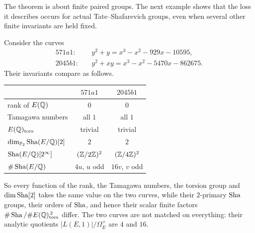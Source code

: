 The theorem is about finite paired groups.  The next example shows that
the loss it describes occurs for actual Tate--Shafarevich groups, even
when several other finite invariants are held fixed.

\begin{example}\label{ex:apparatus:sha-pair}
Consider the curves
\[
\begin{aligned}
  571a1:&\quad y^2+y=x^3-x^2-929x-10595,\\
  2045b1:&\quad y^2+xy=x^3-x^2-5470x-862675.
\end{aligned}
\]
Their invariants compare as follows.
\begin{center}
\small
\begin{tabular}{@{}lcc@{}}
\toprule
 & $571a1$ & $2045b1$ \\
\midrule
rank of $E(\mathbb{Q})$ & $0$ & $0$ \\
Tamagawa numbers & all $1$ & all $1$ \\
$E(\mathbb{Q})_{\operatorname{tors}}$ & trivial & trivial \\
$\dim_{\mathbb F_2}\operatorname{Sha}(E/\mathbb{Q})[2]$ & $2$ & $2$ \\
$\operatorname{Sha}(E/\mathbb{Q})[2^\infty]$ & $(\mathbb{Z}/2\mathbb{Z})^2$ & $(\mathbb{Z}/4\mathbb{Z})^2$ \\
$\#\operatorname{Sha}(E/\mathbb{Q})$ & $4u$, $u$ odd & $16v$, $v$ odd \\
\bottomrule
\end{tabular}
\end{center}
So every function of the rank, the Tamagawa numbers, the torsion group
and $\dim\operatorname{Sha}[2]$ takes the same value on the two curves, while their
$2$-primary $\operatorname{Sha}$ groups, their orders of $\operatorname{Sha}$, and hence their scalar
finite factors $\#\operatorname{Sha}/\#E(\mathbb{Q})_{\operatorname{tors}}^{\,2}$ differ.  The two
curves are not matched on everything: their analytic quotients
$|L(E,1)|/\Omega_E^+$ are $4$ and $16$.
\end{example}

